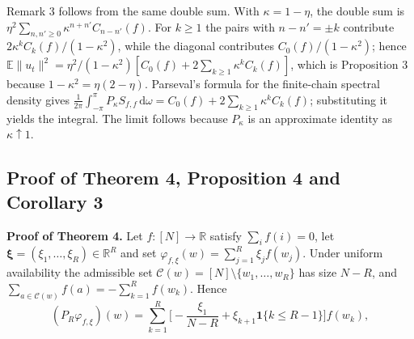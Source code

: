 \documentclass[twoside,11pt]{article}
\begin{document}
Remark 3 follows from the same double sum. With $\kappa=1-\eta$, the double sum is $\eta^{2}\sum_{n,n'\geq0}\kappa^{n+n'}C_{n-n'}(f)$. For $k\geq1$ the pairs with $n-n'=\pm k$ contribute $2\kappa^{k}C_k(f)/(1-\kappa^{2})$, while the diagonal contributes $C_0(f)/(1-\kappa^{2})$; hence $\mathbb{E}\|u_t\|^{2}=\eta^{2}/(1-\kappa^{2})[C_0(f)+2\sum_{k\geq1}\kappa^{k}C_k(f)]$, which is Proposition 3 because $1-\kappa^{2}=\eta(2-\eta)$. Parseval's formula for the finite-chain spectral density gives $\frac{1}{2\pi}\int_{-\pi}^{\pi}P_{\kappa}S_{f,f}\,\mathrm{d}\omega=C_0(f)+2\sum_{k\geq1}\kappa^{k}C_k(f)$; substituting it yields the integral. The limit follows because $P_{\kappa}$ is an approximate identity as $\kappa\uparrow1$.

\subsection{Proof of Theorem 4, Proposition 4 and Corollary 3}
\textbf{Proof of Theorem 4.} Let $f:[N]\to\mathbb{R}$ satisfy $\sum_i f(i)=0$, let $\boldsymbol{\xi}=(\xi_1,\dots,\xi_R)\in\mathbb{R}^{R}$ and set $\varphi_{f,\xi}(w)=\sum_{j=1}^{R}\xi_j f(w_j)$. Under uniform availability the admissible set $\mathcal{C}(w)=[N]\setminus\{w_1,\dots,w_R\}$ has size $N-R$, and $\sum_{a\in\mathcal{C}(w)}f(a)=-\sum_{k=1}^{R}f(w_k)$. Hence
\begin{equation}\label{eq:e42}
(P_R\varphi_{f,\xi})(w)=\sum_{k=1}^{R}\Big[-\dfrac{\xi_1}{N-R}+\xi_{k+1}\mathbf{1}\{k\leq R-1\}\Big]f(w_k),
\end{equation}
\end{document}
